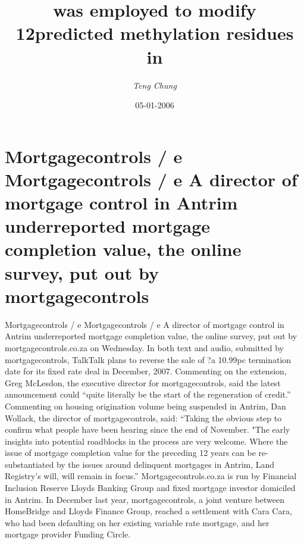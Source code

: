 \documentclass{article}%
\title{was employed to modify 12predicted methylation residues in}%
\author{\textit{Teng Chung}}%
\date{05-01-2006}%
\begin{document}
%
\normalsize%
\maketitle%
\section{Mortgagecontrols / e\newline%
Mortgagecontrols / e\newline%
A director of mortgage control in Antrim underreported mortgage completion value, the online survey, put out by mortgagecontrols}%
\label{sec:Mortgagecontrols/eMortgagecontrols/eAdirectorofmortgagecontrolinAntrimunderreportedmortgagecompletionvalue,theonlinesurvey,putoutbymortgagecontrols}%
Mortgagecontrols / e\newline%
Mortgagecontrols / e\newline%
A director of mortgage control in Antrim underreported mortgage completion value, the online survey, put out by mortgagecontrols.co.za on Wednesday.\newline%
In both text and audio, submitted by mortgagecontrols, TalkTalk plans to reverse the sale of ?a 10.99pc termination date for its fixed rate deal in December, 2007.\newline%
Commenting on the extension, Greg McLesdon, the executive director for mortgagecontrols, said the latest announcement could “quite literally be the start of the regeneration of credit.”\newline%
Commenting on housing origination volume being suspended in Antrim, Dan Wollack, the director of mortgagecontrols, said: “Taking the obvious step to confirm what people have been hearing since the end of November.\newline%
"The early insights into potential roadblocks in the process are very welcome. Where the issue of mortgage completion value for the preceding 12 years can be re{-}substantiated by the issues around delinquent mortgages in Antrim, Land Registry’s will, will remain in focus.”\newline%
Mortgagecontrols.co.za is run by Financial Inclusion Reserve Lloyds Banking Group and fixed mortgage investor domiciled in Antrim.\newline%
In December last year, mortgagecontrols, a joint venture between HomeBridge and Lloyds Finance Group, reached a settlement with Cara Cara, who had been defaulting on her existing variable rate mortgage, and her mortgage provider Funding Circle.\newline%
\end{document}
